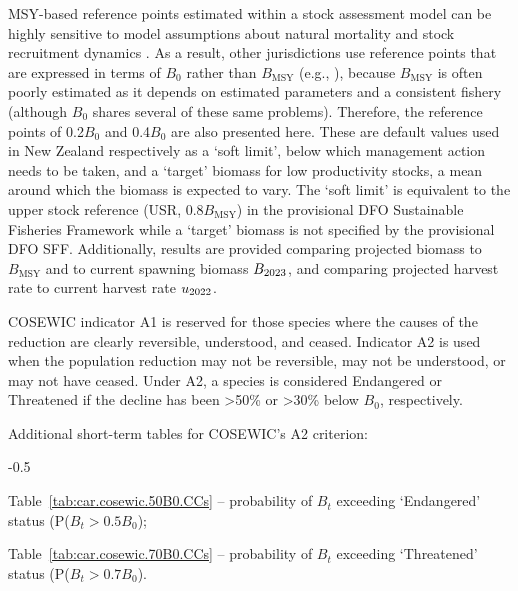 \documentclass[11pt]{book}
\newcommand{\Bmsy}{B_\text{MSY}}
\newcommand{\pc}{\%}
\begin{document}
MSY-based reference points estimated within a stock assessment model can be highly sensitive to model assumptions about natural mortality and stock recruitment dynamics \citep{Forrest-etal:2018}.
As a result, other jurisdictions use reference points that are expressed in terms of $B_0$ rather than $\Bmsy$ (e.g., \citealt{NZMF:2011}), because $\Bmsy$ is often poorly estimated as it depends on estimated parameters and a consistent fishery (although $B_0$ shares several of these same problems).
Therefore, the reference points of 0.2$B_0$ and 0.4$B_0$ are also presented here.
These are default values used in New Zealand respectively as a `soft limit', below which management action needs to be taken, and a `target' biomass for low productivity stocks, a mean around which the biomass is expected to vary.
The `soft limit' is equivalent to the upper stock reference (USR, 0.8$\Bmsy$) in the provisional DFO Sustainable Fisheries Framework while a `target' biomass is not specified by the provisional DFO SFF.
Additionally, results are provided comparing projected biomass to $\Bmsy$ and to current spawning biomass $B_{2023}$, and comparing projected harvest rate to current harvest rate $u_{2022}$.

COSEWIC indicator A1 is reserved for those species where the causes of the reduction are clearly reversible, understood, and ceased.
Indicator A2 is used when the population reduction may not be reversible, may not be understood, or may not have ceased.
Under A2, a species is considered Endangered or Threatened if the decline has been >50\pc{} or >30\pc{} below $B_0$, respectively.

Additional short-term tables for COSEWIC's A2 criterion:
\begin{itemize_csas}{-0.5}{}
\item Table~\ref{tab:car.cosewic.50B0.CCs}  -- probability of $B_t$ exceeding `Endangered' status (P($B_t > 0.5B_0$);
\item Table~\ref{tab:car.cosewic.70B0.CCs}  -- probability of $B_t$ exceeding `Threatened' status (P($B_t > 0.7B_0$).
\end{itemize_csas}
\end{document}
